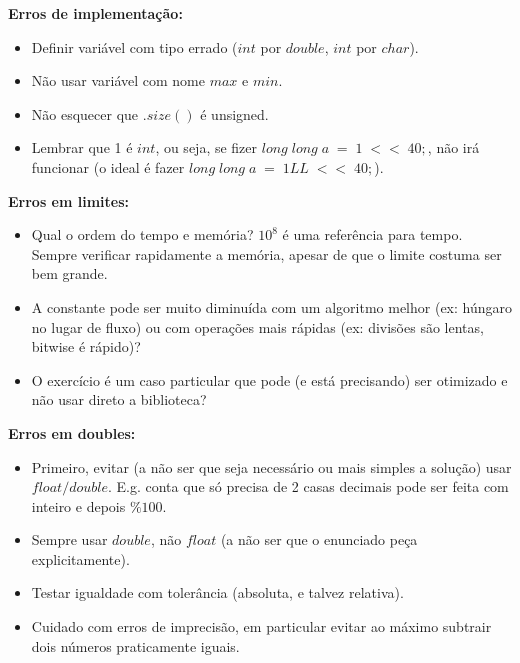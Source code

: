 \begin{multicols}{2}
\textbf{Erros de implementação:}
\begin{itemize}
\itemsep0em
\item Definir variável com tipo errado ($int$ por $double$, $int$ por $char$).
\item Não usar variável com nome $max$ e $min$.
\item Não esquecer que $.size()$ é unsigned.
\item Lembrar que 1 é $int$, ou seja, se fizer $long \; long \; a \; = \; 1 \; << \; 40;$, não irá funcionar (o ideal é fazer $long \; long \; a \; = \; 1LL \; << \; 40;$).
\end{itemize}

\textbf{Erros em limites:}
\begin{itemize}
\itemsep0em
\item Qual o ordem do tempo e memória? $10^8$ é uma referência para tempo. Sempre verificar rapidamente a memória, apesar de que o limite costuma ser bem grande.
\item A constante pode ser muito diminuída com um algoritmo melhor (ex: húngaro no lugar de fluxo) ou com operações mais rápidas (ex: divisões são lentas, bitwise é rápido)?
\item O exercício é um caso particular que pode (e está precisando) ser otimizado e não usar direto a biblioteca? 
\end{itemize}


\textbf{Erros em doubles:}
\begin{itemize}
\itemsep0em
\item Primeiro, evitar (a não ser que seja necessário ou mais simples a solução) usar $float/double$. E.g. conta que só precisa de 2 casas decimais pode ser feita com inteiro e depois $\% 100$.
\item Sempre usar $double$, não $float$ (a não ser que o enunciado peça explicitamente).
\item Testar igualdade com tolerância (absoluta, e talvez relativa).
\item Cuidado com erros de imprecisão, em particular evitar ao máximo subtrair dois números praticamente iguais.
\end{itemize}


\end{multicols}
